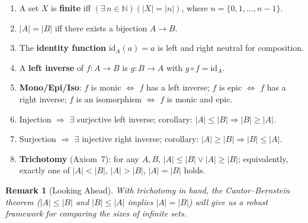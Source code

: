 \documentclass[11pt]{article}
\theoremstyle{defstyle}
\theoremstyle{thmstyle}
\theoremstyle{notstyle}
\newtheorem*{remark}{Remark}
\theoremstyle{cautionstyle}
\newcommand{\N}{\mathbb{N}}
\newcommand{\id}{\mathrm{id}}
\begin{document}
\begin{enumerate}[label=\textbf{\arabic*.}, leftmargin=*, itemsep=4pt]
  \item A set $X$ is \textbf{finite} iff $(\exists\, n \in \N)(|X| = |n|)$, where
        $n = \{0, 1, \dots, n-1\}$.
  \item $|A| = |B|$ iff there exists a bijection $A \to B$.
  \item The \textbf{identity function} $\id_A(a) = a$ is left and right neutral for
        composition.
  \item A \textbf{left inverse} of $f\colon A \to B$ is $g\colon B \to A$ with
        $g \circ f = \id_A$.
  \item \textbf{Mono/Epi/Iso}: $f$ is monic $\iff$ $f$ has a left inverse;
        $f$ is epic $\iff$ $f$ has a right inverse;
        $f$ is an isomorphism $\iff$ $f$ is monic and epic.
  \item Injection $\Rightarrow$ $\exists$ surjective left inverse;
        corollary: $|A| \leq |B| \Rightarrow |B| \geq |A|$.
  \item Surjection $\Rightarrow$ $\exists$ injective right inverse;
        corollary: $|A| \geq |B| \Rightarrow |B| \leq |A|$.
  \item \textbf{Trichotomy} (Axiom~7): for any $A, B$,
        $|A| \leq |B| \lor |A| \geq |B|$; equivalently,
        exactly one of $|A| < |B|$, $|A| > |B|$, $|A| = |B|$ holds.
\end{enumerate}

\begin{notebox}
\begin{remark}[Looking Ahead]
With trichotomy in hand, the Cantor--Bernstein theorem ($|A| \leq |B|$ and
$|B| \leq |A|$ implies $|A| = |B|$) will give us a robust framework for comparing the
sizes of infinite sets.
\end{remark}
\end{notebox}
\end{document}
